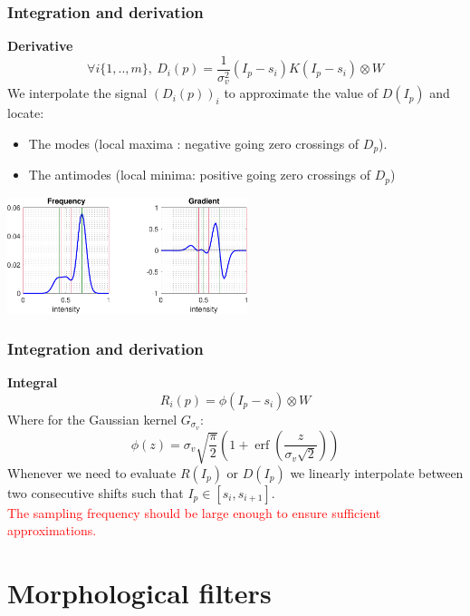 \documentclass [10 pt, xcolor=pdftex,x11names,table]{beamer}
\newcommand{\Gv}{G_{\mathit{\sigma_v}}}
\DeclareMathOperator\erf{erf}
\begin{document}
\begin{frame}
    \frametitle{Integration and derivation}
    \textbf{Derivative}
\[\forall i\{1,..,m\},\: D_i(p)=\frac{1}{\sigma_v^2}(I_p-s_i)K(I_p-s_i)\otimes W\]
We interpolate the signal $(D_i(p))_i$ to approximate the value of $D(I_p)$ and locate:
\begin{itemize}
\item The modes (local maxima : negative going zero crossings of $D_p$).
\item The antimodes (local minima: positive going zero crossings of $D_p$) 
\end{itemize}
\begin{center}\includegraphics[width=7cm]{modes}\end{center}
\end{frame}


\begin{frame}
    \frametitle{Integration and derivation}
    \textbf{Integral}
    \[R_i(p) = \phi(I_p-s_i)\otimes W\]
    Where for the Gaussian kernel $\Gv$:
    \[\phi(z) = \sigma_v \sqrt{\frac{\pi}{2}} \left(1 + \erf\left(\frac{z}{\sigma_v\sqrt{2}}\right)\right)\]
    Whenever we need to evaluate $R(I_p)$ or $D(I_p)$ we linearly interpolate between two consecutive shifts such that $I_p\in[s_i,s_{i+1}]$.\\
    \textcolor{red}{The sampling frequency should be large enough to ensure sufficient approximations.}
\end{frame}

\section{Morphological filters}
\end{document}
